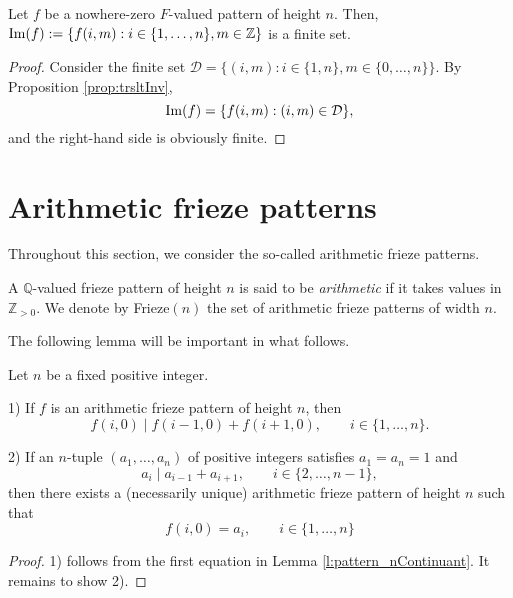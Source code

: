 \begin{corollary}
    \label{cor:imageFinite}
    Let $f$ be a nowhere-zero $F$-valued pattern of height $n$. Then, ${\rm Im}(f) := \{f (i,m) : i \in \{1,\ldots, n\}, m \in \mathbb{Z}\}$ is
    a finite set. 
\end{corollary}
\begin{proof}
    Consider the finite set $\mathcal{D} = \{(i,m) : i \in \{1,n\}, m \in \{0,\ldots, n\}\}$. By Proposition \ref{prop:trsltInv}, 
    \[
        {\rm Im}(f) = \{f (i,m) : (i,m) \in \mathcal{D}\},
    \]
    and the right-hand side is obviously finite. 
\end{proof}

\section{Arithmetic frieze patterns}
Throughout this section, we consider the so-called arithmetic frieze patterns.

\begin{definition}
    \label{def:arith_fp}
        A $\mathbb{Q}$-valued frieze pattern of height $n$ is said to be \textit{arithmetic} if it takes values in $\mathbb{Z}_{>0}$. 
        We denote by Frieze$(n)$ the set of arithmetic frieze patterns of width $n$. 
\end{definition}

The following lemma will be important in what follows. 
\begin{lemma}
    \label{l:testCriteria}
    Let $n$ be a fixed positive integer. 

    1) If $f$ is an arithmetic frieze pattern of height $n$, then
    \[
        f (i,0) \mid f (i-1,0) + f (i+1,0), \qquad i \in \{1, \ldots, n\}.
    \]

    2) If an $n$-tuple $(a_1, \ldots, a_n)$ of positive integers satisfies $a_1 = a_n =1$ and 
    \[
        a_i \mid a_{i-1} + a_{i+1}, \qquad i \in \{2, \ldots, n-1\},
    \]
    then there exists a (necessarily unique) arithmetic frieze pattern of height $n$ such that 
    \[
        f(i,0) = a_i, \qquad i \in \{1, \ldots, n\}
    \]
\end{lemma}
\begin{proof}
    1) follows from the first equation in Lemma \ref{l:pattern_nContinuant}. It remains to show 2). 
\end{proof}

